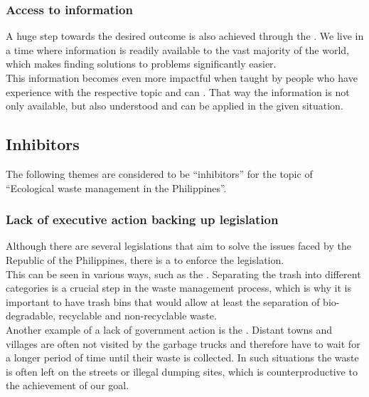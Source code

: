 \documentclass{article}
\newcommand{\nn}{\vspace{\baselineskip}\\}
\newcommand{\hletheme}[1]{\textbf{\color{teal}{#1}}}
\newcommand{\hlitheme}[1]{\textbf{\color{purple}{#1}}}
\begin{document}
\subsubsection{Access to information}
\label{subsubsec:access-to-information}
A huge step towards the desired outcome is also achieved through the
\hletheme{globally available access to information}. We live in a time
where information is readily available to the vast majority of the world,
which makes finding solutions to problems significantly easier.
\nn
This information becomes even more impactful when taught by people who
have experience with the respective topic and can \hletheme{share the 
knowledge through education}.
That way the information is not only available, but also understood and
can be applied in the given situation.

\subsection{Inhibitors}
The following themes are considered to be ``inhibitors'' for the topic of
``Ecological waste management in the Philippines''.

\subsubsection{Lack of executive action backing up legislation}
\label{subsubsec:lack-of-executive-action-backing-up-legislation}
Although there are several legislations that aim to solve the issues
faced by the Republic of the Philippines, there is a \hlitheme{lack 
of government action} to enforce the legislation.
\nn
This can be seen in various ways, such as the \hlitheme{need for more
designated trash bins}.
Separating the trash into different categories is a crucial step in
the waste management process, which is why it is important to have
trash bins that would allow at least the separation of bio-degradable,
recyclable and non-recyclable waste.
\nn
Another example of a lack of government action is the \hlitheme{poor
garbage collection schedule and system}.
Distant towns and villages are often not visited by the garbage trucks
and therefore have to wait for a longer period of time until their
waste is collected.
In such situations the waste is often left on the streets or
illegal dumping sites, which is counterproductive to the achievement
of our goal.

\end{document}
